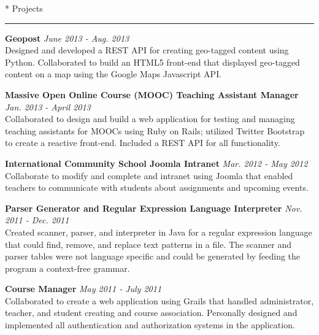 \documentclass{article}
\makeatletter
\renewcommand{\section}[1]{
	\vspace{0.75em} %
	\@startsection
		{section}
		{1}
		{\z@}
		{0em}
		{1em \@minus 1em} %
		{\normalfont\large\sc\bfseries}
		*
		{#1}
	\vspace{-0.75em} %
	\hrule
	\vspace{0.25em} %
	\par
}
\newcommand{\entry}[1]{\def \@entry {#1}}
\newcommand{\dates}[1]{\def \@dates {#1}}
\newenvironment{datedentry}{
		\vspace{0.5em} %
		{\bf \@entry} \hfill {\it \@dates} \\
	}{}
\makeatother
\begin{document}
\section{Projects}

\entry{Geopost}
\dates{June 2013 - Aug. 2013}
\begin{datedentry}
Designed and developed a REST API for creating geo-tagged content using Python.
Collaborated to build an HTML5 front-end that displayed geo-tagged content on a
map using the Google Maps Javascript API.
\end{datedentry}

\entry{Massive Open Online Course (MOOC) Teaching Assistant Manager}
\dates{Jan. 2013 - April 2013}
\begin{datedentry}
Collaborated to design and build a web application for testing and managing
teaching assistants for MOOCs using Ruby on Rails; utilized Twitter Bootstrap to
create a reactive front-end. Included a REST API for all functionality.
\end{datedentry}

\entry{International Community School Joomla Intranet}
\dates{Mar. 2012 - May 2012}
\begin{datedentry}
Collaborate to modify and complete and intranet using Joomla that enabled
teachers to communicate with students about assignments and upcoming events.
\end{datedentry}

\entry{Parser Generator and Regular Expression Language Interpreter}
\dates{Nov. 2011 - Dec. 2011}
\begin{datedentry}
Created scanner, parser, and interpreter in Java for a regular expression
language that could find, remove, and replace text patterns in a file. The
scanner and parser tables were not language specific and could be generated by
feeding the program a context-free grammar.
\end{datedentry}

\entry{Course Manager}
\dates{May 2011 - July 2011}
\begin{datedentry}
Collaborated to create a web application using Grails that handled administrator, teacher, and student creating and course association. Personally designed and implemented all authentication and authorization systems in the application.
\end{datedentry}
\end{document}
